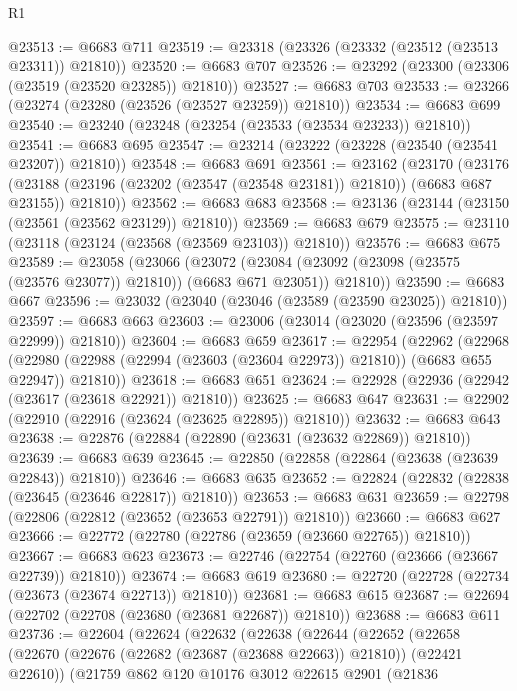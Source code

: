 \begin{lexlean}{R1}
\begin{coremodule}
@23513 := @6683 @711
@23519 := @23318 (@23326 (@23332 (@23512 (@23513 @23311)) @21810))
@23520 := @6683 @707
@23526 := @23292 (@23300 (@23306 (@23519 (@23520 @23285)) @21810))
@23527 := @6683 @703
@23533 := @23266 (@23274 (@23280 (@23526 (@23527 @23259)) @21810))
@23534 := @6683 @699
@23540 := @23240 (@23248 (@23254 (@23533 (@23534 @23233)) @21810))
@23541 := @6683 @695
@23547 := @23214 (@23222 (@23228 (@23540 (@23541 @23207)) @21810))
@23548 := @6683 @691
@23561 := @23162
    (@23170
      (@23176
        (@23188 (@23196 (@23202 (@23547 (@23548 @23181)) @21810)) (@6683 @687 @23155))
        @21810))
@23562 := @6683 @683
@23568 := @23136 (@23144 (@23150 (@23561 (@23562 @23129)) @21810))
@23569 := @6683 @679
@23575 := @23110 (@23118 (@23124 (@23568 (@23569 @23103)) @21810))
@23576 := @6683 @675
@23589 := @23058
    (@23066
      (@23072
        (@23084 (@23092 (@23098 (@23575 (@23576 @23077)) @21810)) (@6683 @671 @23051))
        @21810))
@23590 := @6683 @667
@23596 := @23032 (@23040 (@23046 (@23589 (@23590 @23025)) @21810))
@23597 := @6683 @663
@23603 := @23006 (@23014 (@23020 (@23596 (@23597 @22999)) @21810))
@23604 := @6683 @659
@23617 := @22954
    (@22962
      (@22968
        (@22980 (@22988 (@22994 (@23603 (@23604 @22973)) @21810)) (@6683 @655 @22947))
        @21810))
@23618 := @6683 @651
@23624 := @22928 (@22936 (@22942 (@23617 (@23618 @22921)) @21810))
@23625 := @6683 @647
@23631 := @22902 (@22910 (@22916 (@23624 (@23625 @22895)) @21810))
@23632 := @6683 @643
@23638 := @22876 (@22884 (@22890 (@23631 (@23632 @22869)) @21810))
@23639 := @6683 @639
@23645 := @22850 (@22858 (@22864 (@23638 (@23639 @22843)) @21810))
@23646 := @6683 @635
@23652 := @22824 (@22832 (@22838 (@23645 (@23646 @22817)) @21810))
@23653 := @6683 @631
@23659 := @22798 (@22806 (@22812 (@23652 (@23653 @22791)) @21810))
@23660 := @6683 @627
@23666 := @22772 (@22780 (@22786 (@23659 (@23660 @22765)) @21810))
@23667 := @6683 @623
@23673 := @22746 (@22754 (@22760 (@23666 (@23667 @22739)) @21810))
@23674 := @6683 @619
@23680 := @22720 (@22728 (@22734 (@23673 (@23674 @22713)) @21810))
@23681 := @6683 @615
@23687 := @22694 (@22702 (@22708 (@23680 (@23681 @22687)) @21810))
@23688 := @6683 @611
@23736 := @22604
    (@22624
      (@22632
        (@22638
          (@22644
            (@22652
              (@22658
                (@22670 (@22676 (@22682 (@23687 (@23688 @22663)) @21810)) (@22421 @22610))
                (@21759
                  @862
                  @120
                  @10176
                  @3012
                  @22615
                  @2901
                  (@21836

\end{coremodule}
\end{lexlean}
